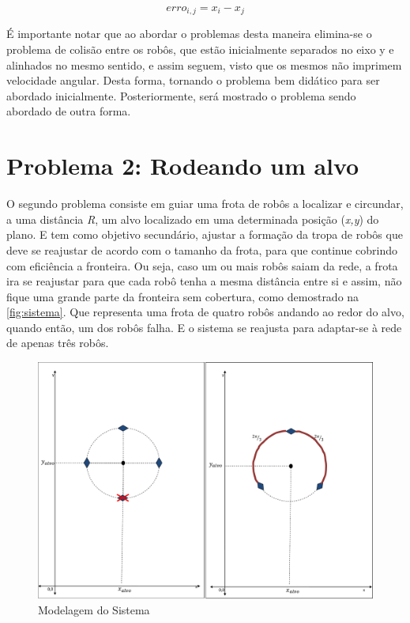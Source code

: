 \begin{equation}
erro_{i,j} = x_{i} - x_{j}
\label{eq:errp1}
\end{equation}

É importante notar que ao abordar o problemas desta maneira elimina-se o problema de colisão entre os robôs, que estão inicialmente separados no eixo y e alinhados no mesmo sentido, e assim seguem, visto que os mesmos não imprimem velocidade angular. Desta forma, tornando o problema bem didático para ser abordado inicialmente. Posteriormente, será mostrado o problema sendo abordado de outra forma.

\section{Problema 2: Rodeando um alvo}


O segundo problema consiste em guiar uma frota de robôs a localizar e circundar, a uma distância \emph{R}, um alvo localizado em uma determinada posição (\emph{x,y}) do plano. E tem como objetivo secundário, ajustar a formação da tropa de robôs que deve se reajustar de acordo com o tamanho da frota, para que continue cobrindo com eficiência a fronteira. Ou seja, caso um ou mais robôs saiam da rede, a frota ira se reajustar para que cada robô tenha a mesma distância entre si e assim, não fique uma grande parte da fronteira sem cobertura, como demostrado na \autoref{fig:sistema}. Que representa uma frota de quatro robôs andando ao redor do alvo, quando então, um dos robôs falha. E o sistema se reajusta para adaptar-se à rede de apenas três robôs.

\begin{figure}[!htb]
	\centering
	\includegraphics[width=1.0\textwidth]{./04-figuras/sistema}
	\caption{Modelagem do Sistema}
	\label{fig:sistema}
\end{figure}
